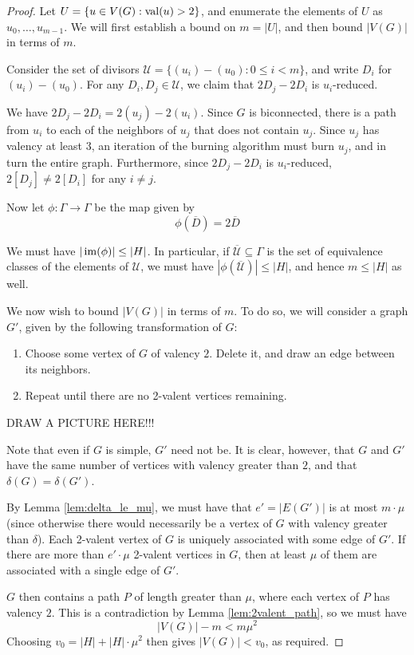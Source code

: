 \documentclass{amsart}
\begin{document}
\begin{proof}
  Let $U = \{u \in V(G) : \operatorname{val}(u) > 2\}$, and enumerate the elements
  of $U$ as $u_0, \ldots, u_{m-1}$. We will first establish a bound on
  $m = |U|$, and then bound $|V(G)|$ in terms of $m$.
  
  Consider the set of divisors $\mathcal{U} = \{(u_i) - (u_0) : 0 \le
  i < m\}$, and write $D_i$ for $(u_i) - (u_0)$. For any $D_i, D_j \in
  \mathcal{U}$, we claim that $2D_j - 2D_i$ is $u_i$-reduced.

  We have $2D_j - 2D_i = 2(u_j) - 2(u_i)$. Since $G$ is biconnected,
  there is a path from $u_i$ to each of the neighbors of $u_j$ that
  does not contain $u_j$. Since $u_j$ has valency at least $3$, an
  iteration of the burning algorithm must burn $u_j$, and in turn the
  entire graph. Furthermore, since $2D_j - 2D_i$ is $u_i$-reduced,
  $2[D_j] \ne 2[D_i]$ for any $i \ne j$.

  Now let $\phi:\Gamma \to \Gamma$ be the map given by
  \[
  \phi(\overline{D}) = 2\overline{D}
  \] 

  We must have $|\operatorname{im}(\phi)| \le |H|$. In particular, if
  $\overline{\mathcal{U}} \subseteq \Gamma$ is the set of equivalence
  classes of the elements of $\mathcal{U}$, we must have
  $|\phi(\overline{\mathcal{U}})| \le |H|$, and hence $m \le |H|$ as
  well.

  We now wish to bound $|V(G)|$ in terms of $m$. To do so, we will
  consider a graph $G'$, given by the following transformation of $G$:

  \begin{enumerate}
    \item Choose some vertex of $G$ of valency $2$. Delete it, and
      draw an edge between its neighbors.
    \item Repeat until there are no 2-valent vertices remaining.
  \end{enumerate}
  
  DRAW A PICTURE HERE!!!

  Note that even if $G$ is simple, $G'$ need not be. It is clear,
  however, that $G$ and $G'$ have the same number of vertices with
  valency greater than $2$, and that $\delta(G) = \delta(G')$.

  By Lemma \ref{lem:delta_le_mu}, we must have that $e' = |E(G')|$ is
  at most $m \cdot \mu$ (since otherwise there would necessarily be a
  vertex of $G$ with valency greater than $\delta$). Each 2-valent
  vertex of $G$ is uniquely associated with some edge of $G'$. If
  there are more than $e' \cdot \mu$ 2-valent vertices in $G$, then at
  least $\mu$ of them are associated with a single edge of $G'$. 

  $G$ then contains a path $P$ of length greater than $\mu$, where
  each vertex of $P$ has valency $2$. This is a contradiction by Lemma
  \ref{lem:2valent_path}, so we must have 
  \[
  |V(G)| - m < m\mu^2
  \] 
  Choosing $v_0 = |H| + |H| \cdot \mu^2$ then gives $|V(G)| < v_0$, as
  required.
\end{proof}
\end{document}
